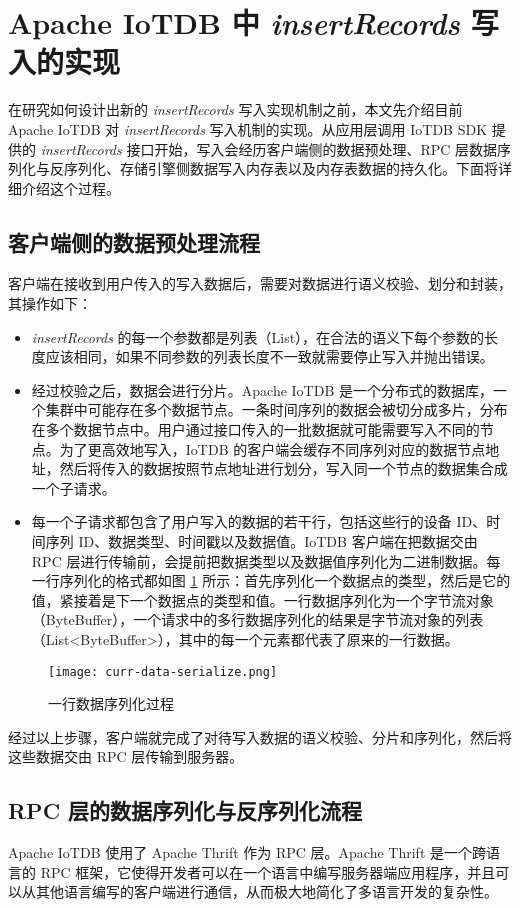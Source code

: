 \section{Apache IoTDB 中 \emph{insertRecords} 写入的实现}
在研究如何设计出新的 \emph{insertRecords} 写入实现机制之前，本文先介绍目前 Apache IoTDB 对 \emph{insertRecords} 写入机制的实现。从应用层调用 IoTDB SDK 提供的 \emph{insertRecords} 接口开始，写入会经历客户端侧的数据预处理、RPC 层数据序列化与反序列化、存储引擎侧数据写入内存表以及内存表数据的持久化。下面将详细介绍这个过程。
\subsection{客户端侧的数据预处理流程}
客户端在接收到用户传入的写入数据后，需要对数据进行语义校验、划分和封装，其操作如下：
\begin{itemize}
  \item \emph{insertRecords} 的每一个参数都是列表（List），在合法的语义下每个参数的长度应该相同，如果不同参数的列表长度不一致就需要停止写入并抛出错误。
  \item 经过校验之后，数据会进行分片。Apache IoTDB 是一个分布式的数据库，一个集群中可能存在多个数据节点。一条时间序列的数据会被切分成多片，分布在多个数据节点中\cite{wang2023apache}。用户通过接口传入的一批数据就可能需要写入不同的节点。为了更高效地写入，IoTDB 的客户端会缓存不同序列对应的数据节点地址，然后将传入的数据按照节点地址进行划分，写入同一个节点的数据集合成一个子请求。
  \item 每一个子请求都包含了用户写入的数据的若干行，包括这些行的设备 ID、时间序列 ID、数据类型、时间戳以及数据值。IoTDB 客户端在把数据交由 RPC 层进行传输前，会提前把数据类型以及数据值序列化为二进制数据。每一行序列化的格式都如图 \ref{fig:curr-line-serialize-format} 所示：首先序列化一个数据点的类型，然后是它的值，紧接着是下一个数据点的类型和值。一行数据序列化为一个字节流对象（ByteBuffer），一个请求中的多行数据序列化的结果是字节流对象的列表（List<ByteBuffer>），其中的每一个元素都代表了原来的一行数据。
\end{itemize}

\begin{figure}
  \centering
  \texttt{[image: curr-data-serialize.png]}
  \caption{一行数据序列化过程}
  \label{fig:curr-line-serialize-format}
\end{figure}

经过以上步骤，客户端就完成了对待写入数据的语义校验、分片和序列化，然后将这些数据交由 RPC 层传输到服务器。
\subsection{RPC 层的数据序列化与反序列化流程}
Apache IoTDB 使用了 Apache Thrift\cite{apache2024thrift} 作为 RPC 层。Apache Thrift 是一个跨语言的 RPC 框架，它使得开发者可以在一个语言中编写服务器端应用程序，并且可以从其他语言编写的客户端进行通信，从而极大地简化了多语言开发的复杂性。

